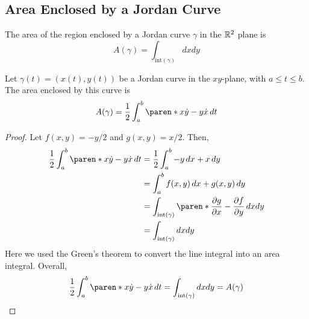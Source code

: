\documentclass[11pt]{penrose}
\renewcommand{\interior}[1]{\mathrm{int}(#1)}
\begin{document}
\subsection{Area Enclosed by a Jordan Curve}
The area of the region enclosed by a Jordan curve $\gamma$ in the $\mathbb{R}^2$ plane is
\begin{equation}
    A(\gamma) = \int_{\interior{\gamma}} dxdy
\end{equation}

\begin{nthm}
    Let $\gamma(t) = (x(t), y(t))$ be a Jordan curve in the $xy$-plane, with $a \leq t \leq b$. The area enclosed by this curve is
    \begin{equation}
        A(\gamma) = \frac{1}{2} \int_a^b \paren*{x\dot{y} - y\dot{x}} \,dt
    \end{equation}
\end{nthm}
\begin{proof}
    Let $f(x,y) = -y/2$ and $g(x,y) = x/2$. Then,
    \begin{align}
        \frac{1}{2} \int_a^b \paren*{x\dot{y} - y\dot{x}} \,dt
        &= \frac{1}{2} \int_a^b  -y \,dx + x \,dy\\
        &= \int_a^b  f(x,y) \,dx + g(x,y) \,dy\\
        &= \int_{\interior{\gamma}} \paren*{ \frac{\pd g}{\pd x} - \frac{\pd f}{\pd y} } \,dxdy\\
        &= \int_{\interior{\gamma}} dxdy
    \end{align}
    Here we used the Green's theorem to convert the line integral into an area integral. Overall,
    \begin{equation}
        \frac{1}{2} \int_a^b \paren*{x\dot{y} - y\dot{x}} \,dt = \int_{\interior{\gamma}} dxdy = A(\gamma)
        \qedhere
    \end{equation}
\end{proof}
\end{document}
